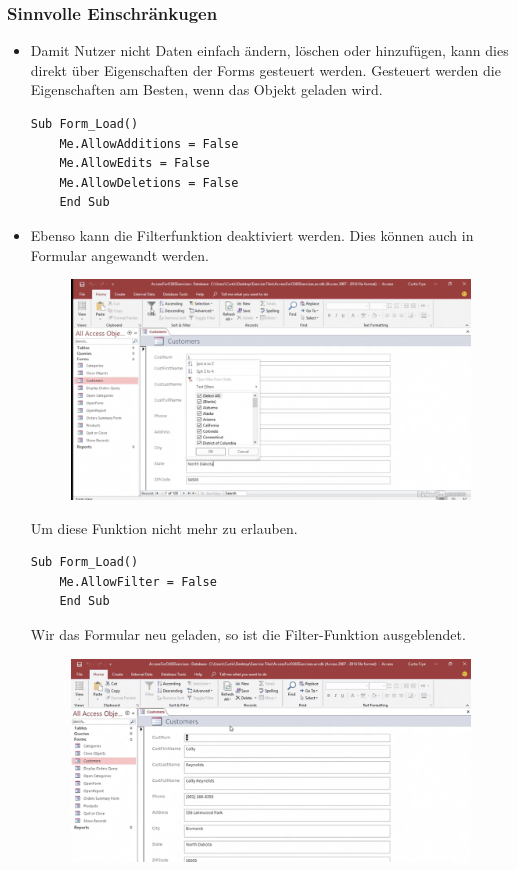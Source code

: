 \subsubsection{Sinnvolle Einschränkugen}
\begin{itemize}
	\item Damit Nutzer nicht Daten einfach ändern, löschen oder hinzufügen, kann dies direkt über Eigenschaften der Forms gesteuert werden. 
	Gesteuert werden die Eigenschaften am Besten, wenn das Objekt geladen wird. 
	\begin{lstlisting}[style=VBA]
	Sub Form_Load()
	Me.AllowAdditions = False
	Me.AllowEdits = False
	Me.AllowDeletions = False
	End Sub
	\end{lstlisting}
	\item Ebenso kann die Filterfunktion deaktiviert werden. Dies können auch in Formular angewandt werden.
	\begin{figure}[H]
		\centering
		\includegraphics[scale = 0.3]{attachment/chapter_2/Scc062}
		\caption{}
		\label{fig:Scc062}
	\end{figure} 
	Um diese Funktion nicht mehr zu erlauben.
	\begin{lstlisting}[style=VBA]
	Sub Form_Load()
	Me.AllowFilter = False
	End Sub
	\end{lstlisting} 
	Wir das Formular neu geladen, so ist die Filter-Funktion ausgeblendet.
	\begin{figure}[H]
		\centering
		\includegraphics[scale = 0.3]{attachment/chapter_2/Scc063}
		\caption{}
		\label{fig:Scc063}
	\end{figure}
\end{itemize}


